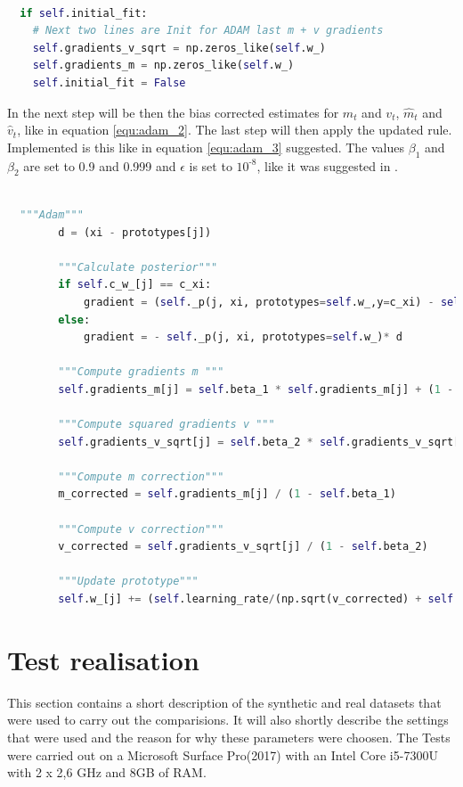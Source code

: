 \documentclass[12pt,oneside,a4paper,parskip]{scrbook}
\begin{document}
\begin{lstlisting}[label=lst:adam,
  language=python,
  firstnumber=1,
  caption= Modification of the \texttt{\_optimize} method to initialize $m_t$ and $v_t$.]			   

  if self.initial_fit:
    # Next two lines are Init for ADAM last m + v gradients
    self.gradients_v_sqrt = np.zeros_like(self.w_)
    self.gradients_m = np.zeros_like(self.w_)
    self.initial_fit = False
\end{lstlisting}

In the next step will be then the bias corrected estimates for $m_t$ and $v_t$, $\hat{m}_t$ and $\hat{v}_t$,
like in equation \ref{equ:adam_2}. 
The last step will then apply the updated rule. Implemented is this like in equation \ref{equ:adam_3} suggested.
The values $\beta_1$ and $\beta_2$ are set to 0.9 and 0.999 and $\epsilon$ is set to $10^\textit{-8}$, like it was suggested in \cite{overvieDiffRSLVQ, Kingma2014AdamAM}.

\pagebreak

\begin{lstlisting}[label=lst:adam,
  language=python,
  firstnumber=1,
  caption= Implementation of Adam on basis of \cite{PassiveDriftonRSLVQ}.]			   

  """Adam"""
        d = (xi - prototypes[j])

        """Calculate posterior"""
        if self.c_w_[j] == c_xi:
            gradient = (self._p(j, xi, prototypes=self.w_,y=c_xi) - self._p(j, xi, prototypes=self.w_))* d
        else:
            gradient = - self._p(j, xi, prototypes=self.w_)* d

        """Compute gradients m """
        self.gradients_m[j] = self.beta_1 * self.gradients_m[j] + (1 - self.beta_1) * gradient

        """Compute squared gradients v """
        self.gradients_v_sqrt[j] = self.beta_2 * self.gradients_v_sqrt[j] + (1 - self.beta_2) * gradient ** 2 

        """Compute m correction"""
        m_corrected = self.gradients_m[j] / (1 - self.beta_1)

        """Compute v correction"""
        v_corrected = self.gradients_v_sqrt[j] / (1 - self.beta_2)

        """Update prototype"""
        self.w_[j] += (self.learning_rate/(np.sqrt(v_corrected) + self.epsilon ))*m_corrected
\end{lstlisting}

\chapter{Test realisation}
This section contains a short description of the synthetic and real datasets that were used to carry out the comparisions.
It will also shortly describe the settings that were used and the reason for why these parameters were choosen.
The Tests were carried out on a Microsoft Surface Pro(2017) with an Intel Core i5-7300U with 2 x 2,6 GHz and 8GB of RAM.
\end{document}
